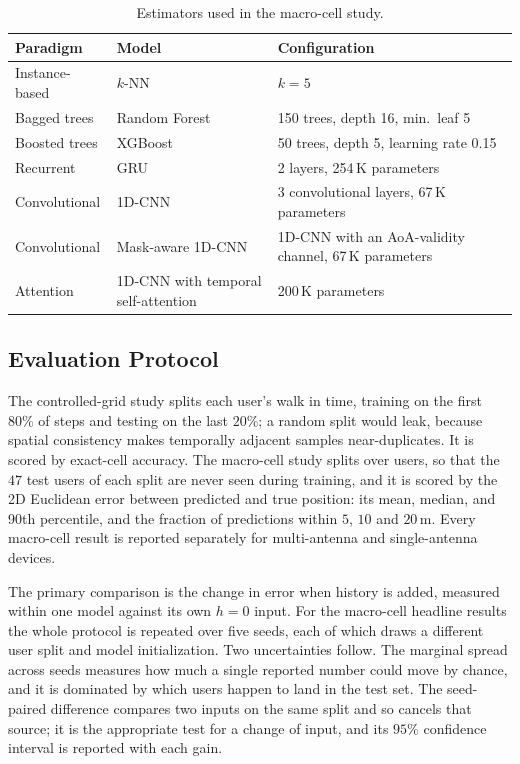 \begin{table}[h]
  \centering
  \caption{Estimators used in the macro-cell study.}
  \label{tab:estimators}
  \small
  \begin{tabular}{@{}lll@{}}
    \toprule
    Paradigm & Model & Configuration \\
    \midrule
    Instance-based & $k$-NN & $k=5$ \\
    Bagged trees & Random Forest & 150 trees, depth 16, min.\ leaf 5 \\
    Boosted trees & XGBoost & 50 trees, depth 5, learning rate 0.15 \\
    Recurrent & GRU & 2 layers, 254\,K parameters \\
    Convolutional & 1D-CNN & 3 convolutional layers, 67\,K parameters \\
    Convolutional & Mask-aware 1D-CNN & 1D-CNN with an AoA-validity channel, 67\,K parameters \\
    Attention & 1D-CNN with temporal self-attention & 200\,K parameters \\
    \bottomrule
  \end{tabular}
\end{table}

\subsection{Evaluation Protocol}
\label{subsec:protocol}

The controlled-grid study splits each user's walk in time, training on the first $80\%$ of steps and testing on the last $20\%$; a random split would leak, because spatial consistency makes temporally adjacent samples near-duplicates. It is scored by exact-cell accuracy. The macro-cell study splits over users, so that the $47$ test users of each split are never seen during training, and it is scored by the 2D Euclidean error between predicted and true position: its mean, median, and 90th percentile, and the fraction of predictions within $5$, $10$ and $20\,\text{m}$. Every macro-cell result is reported separately for multi-antenna and single-antenna devices.

The primary comparison is the change in error when history is added, measured within one model against its own $h=0$ input. For the macro-cell headline results the whole protocol is repeated over five seeds, each of which draws a different user split and model initialization. Two uncertainties follow. The marginal spread across seeds measures how much a single reported number could move by chance, and it is dominated by which users happen to land in the test set. The seed-paired difference compares two inputs on the same split and so cancels that source; it is the appropriate test for a change of input, and its $95\%$ confidence interval is reported with each gain.

